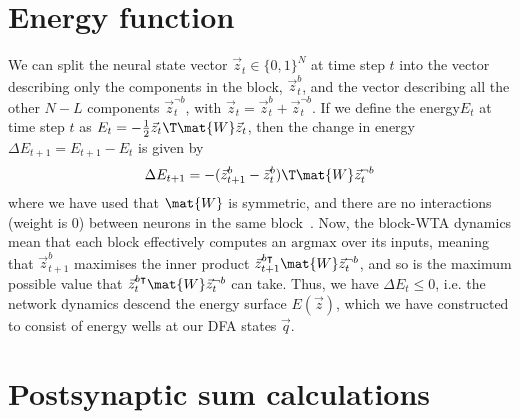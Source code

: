 \section{Energy function}

\label{sec:energy}

We can split the neural state vector $\vec{z}_t \in \{0,1\}^N$ at time step $t$ into the vector describing only the components in the block, $\vec{z}^b_t$, and the vector describing all the other $N-L$ components $\vec{z}^{\neg b}_t$, with $\vec{z}_t = \vec{z}^b_t + \vec{z}^{\neg b}_t$. If we define the energy$E_t$ at time step $t$ as $E_t = - \frac{1}{2}\vec{z}_t\T \mat{W} \vec{z}_t$, then the change in energy $\Delta E_{t+1}  = E_{t+1} - E_t$ is given by
\begin{equation}
    \Delta E_{t+1} = -(\vec{z}_{t+1}^{b} - \vec{z}_{t}^{b})\T \mat{W} \vec{z}_t^{\neg b}
\end{equation}
where we have used that $\mat{W}$ is symmetric, and there are no interactions (weight is 0) between neurons in the same block~\cite{cohen_absolute_1983}. Now, the block-WTA dynamics mean that each block effectively computes an $\mathrm{argmax}$ over its inputs, meaning that $\vec{z}_{t+1}^{b}$ maximises the inner product $\vec{z}_{t+1}^{b \intercal} \mat{W} \vec{z}_t^{\neg b}$, and so is the maximum possible value that $\vec{z}_{t}^{b \intercal} \mat{W} \vec{z}_t^{\neg b}$ can take. Thus, we have $\Delta E_t \leq 0 $, i.e. the network dynamics descend the energy surface $E(\vec{z})$, which we have constructed to consist of energy wells at our DFA states $\vec{q}$.

\section{Postsynaptic sum calculations}


\label{sec:h_calc}
\FloatBarrier

